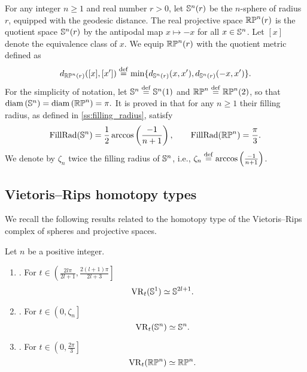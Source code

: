 For any integer $n \geq 1$ and real number $r > 0$, let $\mathbb{S}^n(r)$ be the $n$-sphere of radius $r$, equipped with the geodesic distance.
The real projective space $\mathbb{RP}^n(r)$ is the quotient space $\mathbb{S}^n(r)$ by the antipodal map $x \mapsto -x$ for all $x \in \mathbb{S}^n$.
Let $[x]$ denote the equivalence class of $x$. We equip $\mathbb{RP}^n(r)$ with the quotient metric defined as
\[
d_{\mathbb{RP}^n(r)}([x],[x'])\stackrel{\mathrm{def}}{=}\min \{d_{\mathbb{S}^n(r)}(x,x'),d_{\mathbb{S}^n(r)}(-x,x')\}.
\]
For the simplicity of notation, let $\mathbb{S}^n\stackrel{\mathrm{def}}{=}\mathbb{S}^n(1)$ and $\mathbb{RP}^n\stackrel{\mathrm{def}}{=}\mathbb{RP}^n(2)$, so that $\operatorname{diam}\left(\mathbb{S}^n \right)=\operatorname{diam}\left(\mathbb{RP}^n \right)=\pi.$
It is proved in \cite{katz1983filling} that for any $n \geq 1$ their filling radius, as defined in \cref{ss:filling_radius}, satisfy
\[
\operatorname{FillRad}(\mathbb{S}^n) = \frac{1}{2}\arccos\left(\frac{-1}{n+1}\right), \qquad \operatorname{FillRad}(\mathbb{RP}^n)=\frac{\pi}{3}.
\]
We denote by $\zeta_n$ twice the filling radius of $\mathbb{S}^n$, i.e., $\zeta_n \stackrel{\mathrm{def}}{=} \arccos\left(\frac{-1}{n+1}\right)$.

\subsection{Vietoris--Rips homotopy types}

We recall the following results related to the homotopy type of the Vietoris--Rips complex of spheres and projective spaces.

\begin{proposition}
	Let $n$ be a positive integer.
	\begin{enumerate}[{\rm (a)}]
		\item\label{prop:S1}{\rm \cite[Thm.~7.4]{adamaszek2017vietoris}.}
		For $t \in \left(\frac{2l\pi}{2l+1}, \frac{2(l+1)\pi}{2l+3}\right]$
		\[
		\operatorname{VR}_t(\mathbb{S}^1) \simeq \mathbb{S}^{2l+1}.
		\]

		\item\label{prop:Sn}{\rm \cite[Thm.~10]{lim2020vietoris}.}
		For $t \in \left(0, \zeta_n\right]$
		\[
		\operatorname{VR}_t(\mathbb{S}^n) \simeq \mathbb{S}^n.
		\]

		\item\label{prop:RPn}{\rm \cite[Thm.~4.5]{adams2022metric}.}
		For $t \in \left(0,\frac{2\pi}{3} \right]$
		\[
		\operatorname{VR}_t(\mathbb{RP}^n) \simeq \mathbb{RP}^n.
		\]
	\end{enumerate}
\end{proposition}